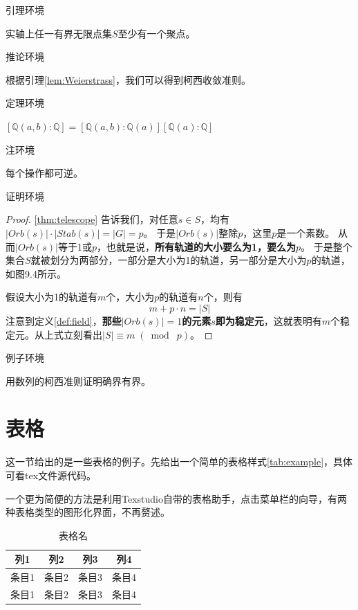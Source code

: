 引理环境
\begin{lemma}\label{lem:Weierstrass}
	实轴上任一有界无限点集$S$至少有一个聚点。
\end{lemma}

推论环境
\begin{corollary}
	根据引理\ref{lem:Weierstrass}，我们可以得到柯西收敛准则。
\end{corollary}

定理环境
\begin{theorem}[望远镜公式]\label{thm:telescope}
	$\left[\mathbb{Q}(a, b) : \mathbb{Q}\right]=\left[\mathbb{Q}(a, b) : \mathbb{Q}(a)\right]\left[\mathbb{Q}(a) : \mathbb{Q}\right] $
\end{theorem}
注环境
\begin{remark}\label{rem:reversible}
	每个操作都可逆。
\end{remark}
证明环境
\begin{proof}
	\autoref{thm:telescope} 告诉我们，对任意$s\in S$，均有$\lvert Orb(s)\rvert \cdot \lvert Stab(s)\rvert=\lvert G\rvert=p$。 于是$\lvert Orb(s)\rvert $整除$p$，这里$p$是一个素数。
	从而$\lvert Orb(s)\rvert $等于1或$p$，也就是说，\textbf{所有轨道的大小要么为1，要么为$p$}。
	于是整个集合$S$就被划分为两部分，一部分是大小为1的轨道，另一部分是大小为$p$的轨道，如图9.4所示。
	
	假设大小为1的轨道有$m$个，大小为$p$的轨道有$n$个，则有
	\begin{equation}
		m+p\cdot n=\lvert S\rvert 
	\end{equation}
	注意到定义\ref{def:field}，\textbf{那些$\lvert Orb(s)\rvert =1$的元素$s$即为稳定元}，这就表明有$m$个稳定元。从上式立刻看出$\lvert S \rvert \equiv  m\; (\bmod\; p)$。
\end{proof}
例子环境
\begin{example}
	用数列的柯西准则证明确界有界。
\end{example}

\section{表格}

这一节给出的是一些表格的例子。先给出一个简单的表格样式\autoref{tab:example}，具体可看tex文件源代码。

一个更为简便的方法是利用Texstudio自带的表格助手，点击菜单栏的向导，有两种表格类型的图形化界面，不再赘述。
\begin{table}[!htp]
	\centering
	\caption{表格名}
	\begin{tabular}{c|c|c|c}\label{tab:example}
		列1	&	列2	&	列3	&	列4\\
		\hline
		条目1	& 条目2	&	条目3	&	条目4 \\
		条目1	& 条目2	&	条目3	&	条目4 
	\end{tabular}
	\label{table1}
\end{table}

